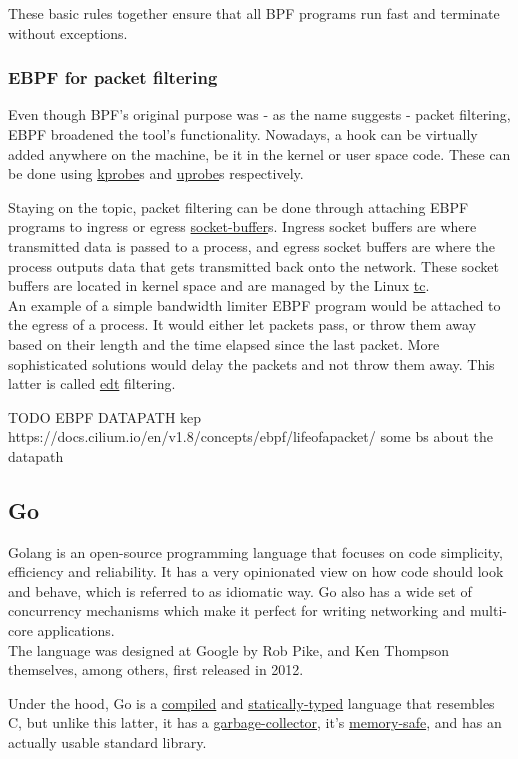 These basic rules together ensure that all BPF programs run fast and terminate without exceptions.


\subsubsection{EBPF for packet filtering}
Even though BPF's original purpose was - as the name suggests - packet filtering, EBPF broadened the tool's functionality. Nowadays, a hook can be virtually added anywhere on the machine, be it in the kernel or user space code. These can be done using \underline{\gls{kprobe}}s and \underline{\gls{uprobe}}s respectively.

Staying on the topic, packet filtering can be done through attaching EBPF programs to ingress or egress \underline{\gls{socket-buffer}}s. Ingress socket buffers are where transmitted data is passed to a process, and egress socket buffers are where the process outputs data that gets transmitted back onto the network. These socket buffers are located in kernel space and are managed by the Linux \underline{\gls{tc}}. \\

An example of a simple bandwidth limiter EBPF program would be attached to the egress of a process. It would either let packets pass, or throw them away based on their length and the time elapsed since the last packet. More sophisticated solutions would delay the packets and not throw them away. This latter is called \underline{\gls{edt}} filtering.

\newpage
TODO EBPF DATAPATH kep https://docs.cilium.io/en/v1.8/concepts/ebpf/lifeofapacket/
some bs about the datapath

\subsection{Go}
Golang\cite{go} is an open-source programming language that focuses on code simplicity, efficiency and reliability. It has a very opinionated view on how code should look and behave, which is referred to as idiomatic way. Go also has a wide set of concurrency mechanisms which make it perfect for writing networking and multi-core applications. \\

The language was designed at Google\cite{google} by Rob Pike\cite{rpike}, and Ken Thompson\cite{kthompson} themselves, among others, first released in 2012\cite{go-1}.

Under the hood, Go is a \underline{\gls{compiled}} and \underline{\gls{statically-typed}} language that resembles C\cite{c}, but unlike this latter, it has a \underline{\gls{garbage-collector}}, it's \underline{\gls{memory-safe}}, and has an actually usable standard library. \\

